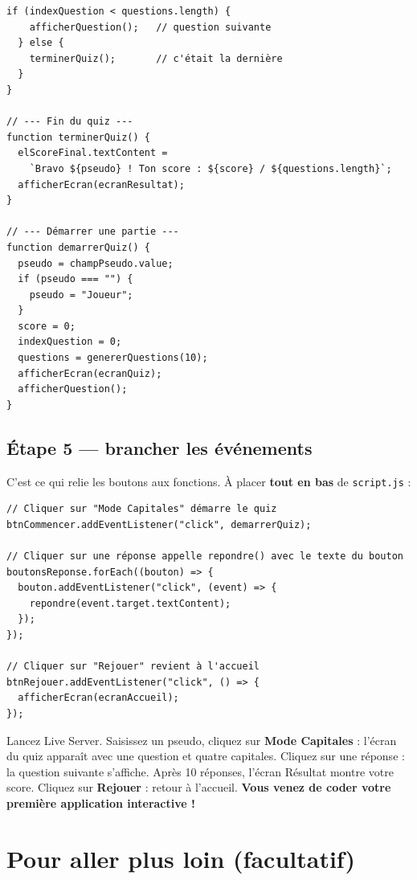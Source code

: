 \documentclass[11pt,a4paper]{article}
\newcommand{\code}[1]{\texttt{#1}}
\begin{document}
\begin{lstlisting}[style=js]
  if (indexQuestion < questions.length) {
    afficherQuestion();   // question suivante
  } else {
    terminerQuiz();       // c'était la dernière
  }
}

// --- Fin du quiz ---
function terminerQuiz() {
  elScoreFinal.textContent =
    `Bravo ${pseudo} ! Ton score : ${score} / ${questions.length}`;
  afficherEcran(ecranResultat);
}

// --- Démarrer une partie ---
function demarrerQuiz() {
  pseudo = champPseudo.value;
  if (pseudo === "") {
    pseudo = "Joueur";
  }
  score = 0;
  indexQuestion = 0;
  questions = genererQuestions(10);
  afficherEcran(ecranQuiz);
  afficherQuestion();
}
\end{lstlisting}

\subsection{Étape 5 --- brancher les événements}

C'est ce qui relie les boutons aux fonctions. À placer \textbf{tout en bas} de \code{script.js} :

\begin{lstlisting}[style=js]
// Cliquer sur "Mode Capitales" démarre le quiz
btnCommencer.addEventListener("click", demarrerQuiz);

// Cliquer sur une réponse appelle repondre() avec le texte du bouton
boutonsReponse.forEach((bouton) => {
  bouton.addEventListener("click", (event) => {
    repondre(event.target.textContent);
  });
});

// Cliquer sur "Rejouer" revient à l'accueil
btnRejouer.addEventListener("click", () => {
  afficherEcran(ecranAccueil);
});
\end{lstlisting}

\begin{infobox}
Lancez Live Server. Saisissez un pseudo, cliquez sur \textbf{Mode Capitales} : l'écran du quiz apparaît avec une question et quatre capitales. Cliquez sur une réponse : la question suivante s'affiche. Après 10 réponses, l'écran Résultat montre votre score. Cliquez sur \textbf{Rejouer} : retour à l'accueil. \textbf{Vous venez de coder votre première application interactive !}
\end{infobox}

\section{Pour aller plus loin (facultatif)}
\end{document}

